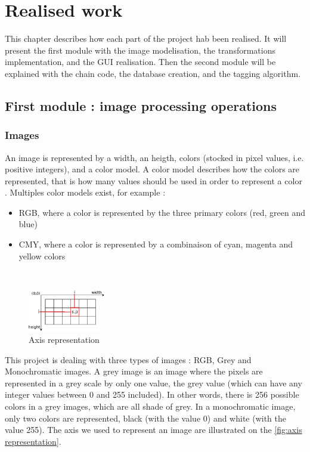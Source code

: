 \chapter{Realised work}


This chapter describes how each part of the project hab been realised. It will present the first module with the image modelisation, the transformations implementation, and the \gls{GUI} realisation. Then the second module will be explained with the chain code, the database creation, and the tagging algorithm.


\section{First module : image processing operations}


\subsection{Images}

An image is represented by a width, an heigth, colors (stocked in pixel values, i.e. positive integers), and a color model. A color model describes how the colors are represented, that is how many values should be used in order to represent a color \cite{bib:image:ColorModel}. Multiples color models exist, for example : 
\begin{itemize}
	\item RGB, where a color is represented by the three primary colors (red, green and blue)
	\item CMY, where a color is represented by a combinaison of cyan, magenta and yellow colors
\end{itemize}


~~

\begin{figure}
	\centering
	\includegraphics[width=0.3\textwidth]{images/axis/axis_representation}
	\caption{Axis representation}
	\label{fig:axis representation}
\end{figure}


This project is dealing with three types of images : RGB, Grey and Monochromatic images. A grey image is an image where the pixels are represented in a grey scale by only one value, the grey value (which can have any integer values between 0 and 255 included). In other words, there is 256 possible colors in a grey images, which are all shade of grey. In a monochromatic image, only two colors are represented, black (with the value 0) and white (with the value 255). The axis we used to represent an image are illustrated on the \vref{fig:axis representation}. 

